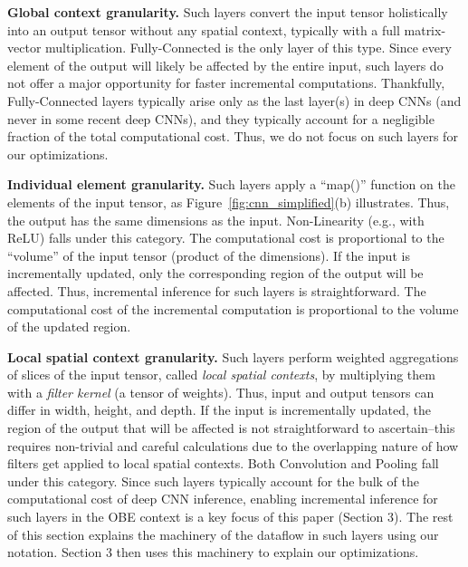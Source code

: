 \vspace{2mm}
\noindent \textbf{Global context granularity.} 
Such layers convert the input tensor holistically into an output tensor without any spatial context, typically with a full matrix-vector multiplication.
Fully-Connected is the only layer of this type. Since every element of the output will likely be affected by the entire input, such layers do not offer a major opportunity for faster incremental computations. Thankfully, Fully-Connected layers typically arise only as the last layer(s) in deep CNNs (and never in some recent deep CNNs), and they typically account for a negligible fraction of the total computational cost. Thus, we do not focus on such layers for our optimizations.

\vspace{2mm}
\noindent \textbf{Individual element granularity.} 
Such layers apply a ``map()'' function on the elements of the input tensor, as Figure~\ref{fig:cnn_simplified}(b) illustrates.
Thus, the output has the same dimensions as the input. Non-Linearity (e.g., with ReLU) falls under this category. The computational cost is proportional to the ``volume'' of the input tensor (product of the dimensions). If the input is incrementally updated, only the corresponding region of the output will be affected. Thus, incremental inference for such layers is straightforward. The computational cost of the incremental computation is proportional to the volume of the updated region.

\vspace{2mm}
\noindent \textbf{Local spatial context granularity.}
Such layers perform weighted aggregations of slices of the input tensor, called \textit{local spatial contexts}, by multiplying them with a \textit{filter kernel} (a tensor of weights). Thus, input and output tensors can differ in width, height, and depth. If the input is incrementally updated, the region of the output that will be affected is not straightforward to ascertain--this requires non-trivial and careful calculations due to the overlapping nature of how filters get applied to local spatial contexts. Both Convolution and Pooling fall under this category. Since such layers typically account for the bulk of the computational cost of deep CNN inference, enabling incremental inference for such layers in the OBE context is a key focus of this paper (Section 3). The rest of this section explains the machinery of the dataflow in such layers using our notation. Section 3 then uses this machinery to explain our optimizations.

